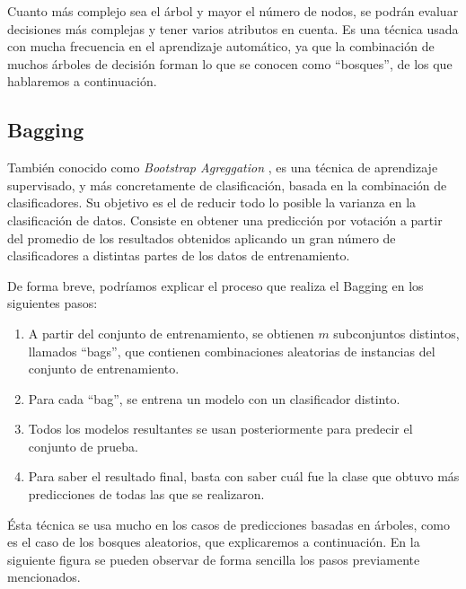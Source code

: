 
Cuanto más complejo sea el árbol y mayor el número de nodos, se podrán evaluar decisiones más complejas y tener varios atributos en cuenta. Es una técnica usada con mucha frecuencia en el aprendizaje automático, ya que la combinación de muchos árboles de decisión forman lo que se conocen como ``bosques'', de los que hablaremos a continuación.

\subsection{Bagging}

También conocido como \emph{Bootstrap Agreggation} \cite{breiman1996bagging}, es una técnica de aprendizaje supervisado, y más concretamente de clasificación, basada en la combinación de clasificadores. Su objetivo es el de reducir todo lo posible la varianza en la clasificación de datos. Consiste en obtener una predicción por votación a partir del promedio de los resultados obtenidos aplicando un gran número de clasificadores a distintas partes de los datos de entrenamiento.

De forma breve, podríamos explicar el proceso que realiza el Bagging en los siguientes pasos:

\begin{enumerate}

\item  A partir del conjunto de entrenamiento, se obtienen $m$ subconjuntos distintos, llamados ``bags'', que contienen combinaciones aleatorias de instancias del conjunto de entrenamiento.

\item Para cada ``bag'', se entrena un modelo con un clasificador distinto.

\item Todos los modelos resultantes se usan posteriormente para predecir el conjunto de prueba.

\item Para saber el resultado final, basta con saber cuál fue la clase que obtuvo más predicciones de todas las que se realizaron.

\end{enumerate}

Ésta técnica se usa mucho en los casos de predicciones basadas en árboles, como es el caso de los bosques aleatorios, que explicaremos a continuación. En la siguiente figura se pueden observar de forma sencilla los pasos previamente mencionados.


